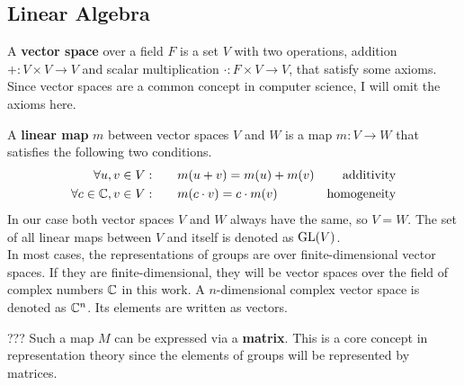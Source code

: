 \subsection{Linear Algebra}

A \textbf{vector space} over a field $F$ is a set $V$ with two operations, addition $+: V \times V \to V$ and scalar multiplication $\cdot: F \times V \to V$, that satisfy some axioms.
Since vector spaces are a common concept in computer science, I will omit the axioms here.

A \textbf{linear map} $m$ between vector spaces $V$ and $W$ is a map $m: V \to W$ that satisfies the following two conditions.
\begin{align}
    \forall u, v \in V: \qquad & m(u + v) = m(u) + m(v) & \text{additivity} \\
    \forall c \in \mathbb{C}, v \in V: \qquad & m(c \cdot v) = c \cdot m(v) & \text{homogeneity}
\end{align}
In our case both vector spaces $V$ and $W$ always have the same, so $V = W$.
The set of all linear maps between $V$ and itself is denoted as $\text{GL}(V)$.
\\

In most cases, the representations of groups are over finite-dimensional vector spaces.
If they are finite-dimensional, they will be vector spaces over the field of complex numbers $\mathbb{C}$ in this work.
A $n$-dimensional complex vector space is denoted as $\mathbb{C}^n$.
Its elements are written as vectors.

???
Such a map $M$ can be expressed via a \textbf{matrix}.
This is a core concept in representation theory since the elements of groups will be represented by matrices.
